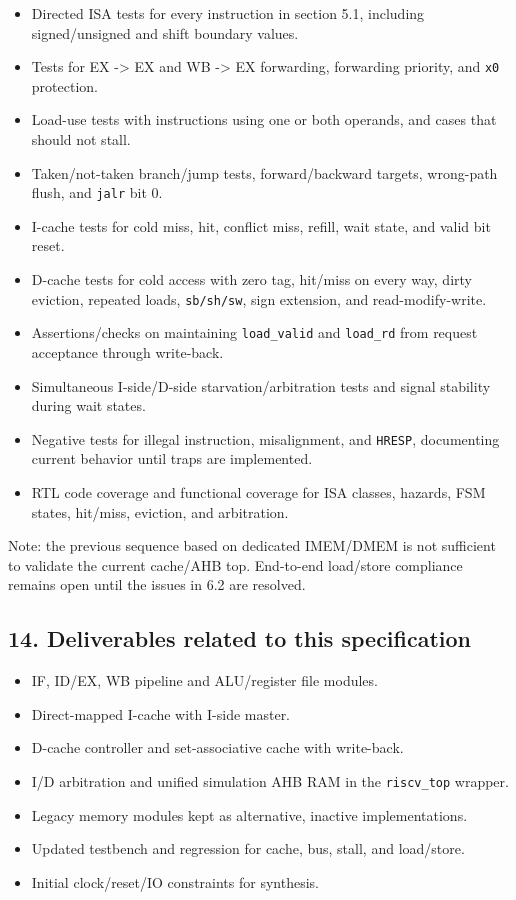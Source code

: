 \documentclass[]{article}
\providecommand{\tightlist}{%
  \setlength{\itemsep}{0pt}\setlength{\parskip}{0pt}}
\begin{document}
\begin{itemize}
\tightlist
\item
  Directed ISA tests for every instruction in section 5.1, including
  signed/unsigned and shift boundary values.
\item
  Tests for EX -\textgreater{} EX and WB -\textgreater{} EX forwarding,
  forwarding priority, and \texttt{x0} protection.
\item
  Load-use tests with instructions using one or both operands, and cases
  that should not stall.
\item
  Taken/not-taken branch/jump tests, forward/backward targets,
  wrong-path flush, and \texttt{jalr} bit 0.
\item
  I-cache tests for cold miss, hit, conflict miss, refill, wait state,
  and valid bit reset.
\item
  D-cache tests for cold access with zero tag, hit/miss on every way,
  dirty eviction, repeated loads, \texttt{sb/sh/sw}, sign extension, and
  read-modify-write.
\item
  Assertions/checks on maintaining \texttt{load\_valid} and
  \texttt{load\_rd} from request acceptance through write-back.
\item
  Simultaneous I-side/D-side starvation/arbitration tests and signal
  stability during wait states.
\item
  Negative tests for illegal instruction, misalignment, and
  \texttt{HRESP}, documenting current behavior until traps are
  implemented.
\item
  RTL code coverage and functional coverage for ISA classes, hazards,
  FSM states, hit/miss, eviction, and arbitration.
\end{itemize}

Note: the previous sequence based on dedicated IMEM/DMEM is not
sufficient to validate the current cache/AHB top. End-to-end load/store
compliance remains open until the issues in 6.2 are resolved.

\hypertarget{14-deliverables-related-to-this-specification}{%
\subsection{14. Deliverables related to this
specification}\label{14-deliverables-related-to-this-specification}}

\begin{itemize}
\tightlist
\item
  IF, ID/EX, WB pipeline and ALU/register file modules.
\item
  Direct-mapped I-cache with I-side master.
\item
  D-cache controller and set-associative cache with write-back.
\item
  I/D arbitration and unified simulation AHB RAM in the
  \texttt{riscv\_top} wrapper.
\item
  Legacy memory modules kept as alternative, inactive implementations.
\item
  Updated testbench and regression for cache, bus, stall, and
  load/store.
\item
  Initial clock/reset/IO constraints for synthesis.
\end{itemize}
\end{document}
